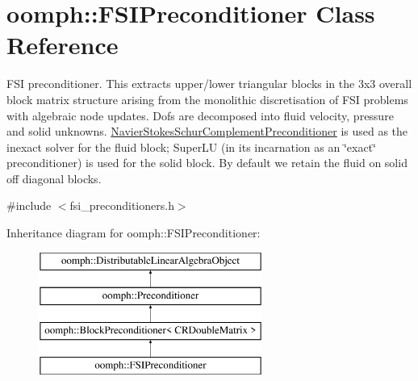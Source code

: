 \hypertarget{classoomph_1_1FSIPreconditioner}{}\section{oomph\+:\+:F\+S\+I\+Preconditioner Class Reference}
\label{classoomph_1_1FSIPreconditioner}


F\+SI preconditioner. This extracts upper/lower triangular blocks in the 3x3 overall block matrix structure arising from the monolithic discretisation of F\+SI problems with algebraic node updates. Dofs are decomposed into fluid velocity, pressure and solid unknowns. \hyperlink{classoomph_1_1NavierStokesSchurComplementPreconditioner}{Navier\+Stokes\+Schur\+Complement\+Preconditioner} is used as the inexact solver for the fluid block; Super\+LU (in its incarnation as an \char`\"{}exact\char`\"{} preconditioner) is used for the solid block. By default we retain the fluid on solid off diagonal blocks.  




{\ttfamily \#include $<$fsi\+\_\+preconditioners.\+h$>$}

Inheritance diagram for oomph\+:\+:F\+S\+I\+Preconditioner\+:\begin{figure}[H]
\begin{center}
\leavevmode
\includegraphics[height=4.000000cm]{classoomph_1_1FSIPreconditioner}
\end{center}
\end{figure}
